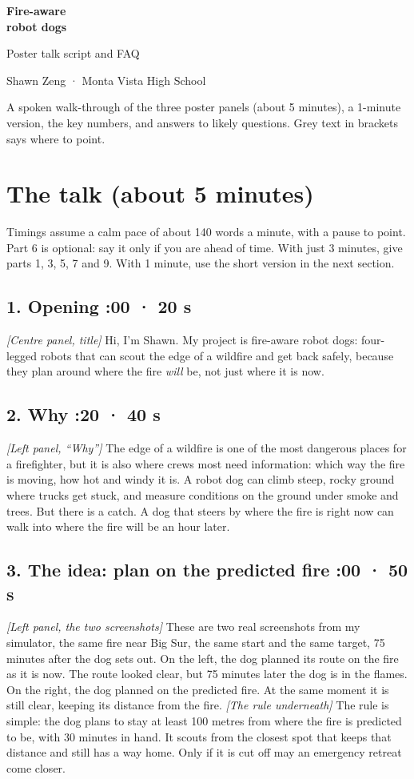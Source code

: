 \documentclass[11pt]{article}
\newcommand{\cue}[1]{{\color{cue}\itshape [#1]}}
\newcommand{\talkpart}[2]{\subsection{#1 \hfill {\normalsize\color{cue}\mdseries #2}}}
\begin{document}
{\Huge\bfseries Fire-aware\\[2pt]{\color{swissred}robot dogs}}\par
\medskip
{\Large Poster talk script and FAQ}\par
\smallskip
Shawn Zeng · Monta Vista High School\par
\medskip
{\color{cue}A spoken walk-through of the three poster panels (about 5 minutes), a 1-minute version, the key numbers, and answers to likely questions. Grey text in brackets says where to point.}

\section{The talk (about 5 minutes)}

{\color{cue}Timings assume a calm pace of about 140 words a minute, with a pause to point. Part 6 is optional: say it only if you are ahead of time. With just 3 minutes, give parts 1, 3, 5, 7 and 9. With 1 minute, use the short version in the next section.}

\talkpart{1. Opening}{0:00 · 20 s}
\cue{Centre panel, title}
Hi, I'm Shawn. My project is fire-aware robot dogs: four-legged robots that can scout the edge of a wildfire and get back safely, because they plan around where the fire \emph{will} be, not just where it is now.

\talkpart{2. Why}{0:20 · 40 s}
\cue{Left panel, ``Why''}
The edge of a wildfire is one of the most dangerous places for a firefighter, but it is also where crews most need information: which way the fire is moving, how hot and windy it is. A robot dog can climb steep, rocky ground where trucks get stuck, and measure conditions on the ground under smoke and trees.
But there is a catch. A dog that steers by where the fire is right now can walk into where the fire will be an hour later.

\talkpart{3. The idea: plan on the predicted fire}{1:00 · 50 s}
\cue{Left panel, the two screenshots}
These are two real screenshots from my simulator, the same fire near Big Sur, the same start and the same target, 75 minutes after the dog sets out.
On the left, the dog planned its route on the fire as it is now. The route looked clear, but 75 minutes later the dog is in the flames.
On the right, the dog planned on the predicted fire. At the same moment it is still clear, keeping its distance from the fire.
\cue{The rule underneath}
The rule is simple: the dog plans to stay at least 100 metres from where the fire is predicted to be, with 30 minutes in hand. It scouts from the closest spot that keeps that distance and still has a way home. Only if it is cut off may an emergency retreat come closer.
\end{document}
